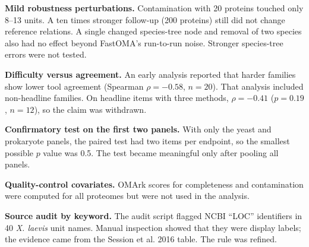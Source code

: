 \documentclass[10pt]{article}
\begin{document}
\textbf{Mild robustness perturbations.} Contamination with 20 proteins touched only 8--13 units. A ten times stronger
follow-up (200 proteins) still did not change reference relations. A single changed species-tree node and removal of
two species also had no effect beyond FastOMA's run-to-run noise. Stronger species-tree errors were not tested.

\textbf{Difficulty versus agreement.} An early analysis reported that harder families show lower tool agreement
(Spearman $\rho=-0.58$, $n=20$). That analysis included non-headline families. On headline items with three methods,
$\rho=-0.41$ ($p=0.19$, $n=12$), so the claim was withdrawn.

\textbf{Confirmatory test on the first two panels.} With only the yeast and prokaryote panels, the paired test had two
items per endpoint, so the smallest possible $p$ value was 0.5. The test became meaningful only after pooling all panels.

\textbf{Quality-control covariates.} OMArk scores for completeness and contamination were computed for all proteomes but
were not used in the analysis.

\textbf{Source audit by keyword.} The audit script flagged NCBI ``LOC'' identifiers in 40 \textit{X. laevis} unit
names. Manual inspection showed that they were display labels; the evidence came from the Session et al. 2016 table.
The rule was refined.
\end{document}
